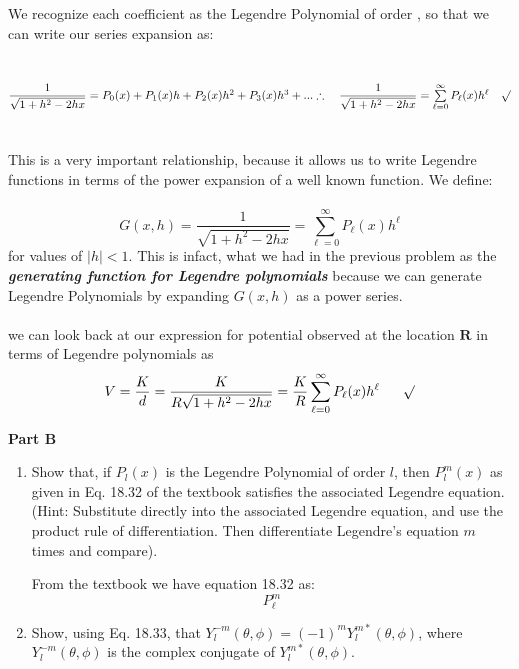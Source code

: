 \documentclass[fleqn]{article}
\begin{document}
\begin{enumerate}
{      \\
      \\
      We recognize each coefficient as the Legendre Polynomial of order , so that we can write our series expansion as: \\
      \\
      \\
      $
        \dfrac{1}{\sqrt{1+h^2-2hx}}=P_0(x)+P_1(x)h+P_2(x)h^2+P_3(x) h^3+... \\
        \\
        \\
        \therefore ~~~ \dfrac{1}{\sqrt{1+h^2-2hx}}=\sum\limits_{\ell=0}^{\infty} P_{\ell}(x) h^{\ell} ~~~ \surd
      $ \\
      \\
      \\
      This is a very important relationship, because it allows us to write Legendre functions in
      terms of the power expansion of a well known function. We define: \\
      \\
      $$G(x,h)=\dfrac{1}{\sqrt{1+h^2-2hx}}=\sum\limits_{\ell=0}^{\infty} P_{\ell}(x) h^{\ell}$$
      for values of $|h|<1$. This is infact, what we had in the previous problem as the 
      \emph{\textbf{generating function for Legendre polynomials}} because we can
      generate Legendre Polynomials by expanding $G(x,h)$ as a power series. \\
      \\
      we can look back at our expression for potential observed at the location $\mathbf{R}$ in terms
      of Legendre polynomials as
      $$V=\dfrac{K}{d}=\dfrac{K}{R\sqrt{1+h^2-2hx}}=\dfrac{K}{R} \sum\limits_{\ell=0}^{\infty} P_{\ell}(x) h^{\ell} ~~~~~ \surd$$
    }

  \end{enumerate}

  \pagebreak

  \textbf{Part B}
  \begin{enumerate}
    \item Show that, if $P_l(x)$ is the Legendre Polynomial of order $l$, then $P^m_l(x)$  as given in Eq. 18.32 of the textbook satisfies
    the associated Legendre equation. (Hint:  Substitute directly into the associated Legendre equation, and use the product rule of differentiation. Then differentiate Legendre's equation $m$ times and compare). 

      \textcolor{hwColor}{
        From the textbook we have equation 18.32 as: 
        $$P^m_{\ell}$$
      }

    \item Show, using Eq. 18.33, that
    $Y^{-m}_l (\theta, \phi) = (-1)^m Y^{m\ast }_l (\theta, \phi) $, 
    where $Y^{-m}_l (\theta, \phi)$ is the complex conjugate of $Y^{m\ast }_l (\theta, \phi)$.
  \end{enumerate}
\end{document}
